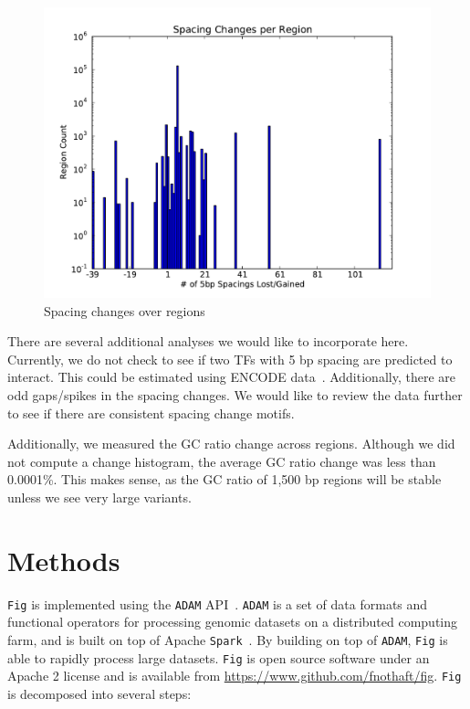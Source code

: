 \documentclass[11pt]{article}
\theoremstyle{plain}
\begin{document}
\begin{figure}[h]
\begin{center}
\includegraphics[width=0.25\linewidth]{graphs/spacing.pdf}
\end{center}
\caption{Spacing changes over regions}
\label{fig:spacing}
\end{figure}

There are several additional analyses we would like to incorporate here. Currently,
we do not check to see if two TFs with 5 bp spacing are predicted to interact. This
could be estimated using ENCODE data~\cite{gerstein12}. Additionally, there are odd
gaps/spikes in the spacing changes. We would like to review the data further to see
if there are consistent spacing change motifs.

Additionally, we measured the GC ratio change across regions. Although we did not
compute a change histogram, the average GC ratio change was less than 0.0001\%.
This makes sense, as the GC ratio of 1,500 bp regions will be stable unless we
see very large variants.

\section{Methods}
\label{sec:methods}

\texttt{Fig} is implemented using the \texttt{ADAM} API~\cite{massie13, nothaft15}.
\texttt{ADAM} is a set of data formats and functional operators for processing genomic
datasets on a distributed computing farm, and is built on top of Apache
\texttt{Spark}~\cite{zaharia12, zaharia10}. By building on top of \texttt{ADAM},
\texttt{Fig} is able to rapidly process large datasets. \texttt{Fig} is open source
software under an Apache 2 license and is available from
\url{https://www.github.com/fnothaft/fig}. \texttt{Fig} is decomposed into several steps:
\end{document}
